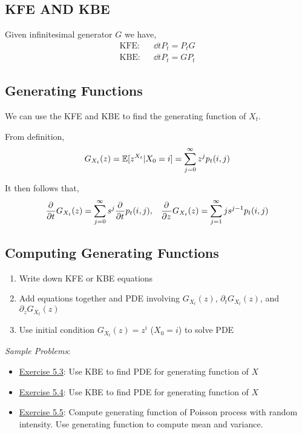 \documentclass[12pt]{article}
\begin{document}
\subsection{KFE AND KBE}
Given infinitesimal generator \( G \) we have,
\begin{align*}
    \text{KFE}: && \dd{}{t}P_t = P_t G \\
    \text{KBE}: && \dd{}{t}P_t = GP_t
\end{align*}

\subsection{Generating Functions}
We can use the KFE and KBE to find the generating function of \( X_t \).

From definition,
\begin{align*}
    G_{X_t}(z) = \mathbb{E}[z^{X_t} | X_0 = i] = \sum_{j=0}^{\infty} z^j p_t(i,j)
\end{align*}

It then follows that,
\begin{align*}
    \frac{\partial^{}}{\partial t^{}}G_{X_t}(z) = \sum_{j=0}^{\infty} s^j  \frac{\partial^{}}{\partial t^{}} p_{t}(i,j) 
    ,&&
    \frac{\partial^{}}{\partial z^{}}G_{X_t}(z) = \sum_{j=1}^{\infty} js^{j-1}p_t(i,j)
\end{align*}

\subsection{Computing Generating Functions}
\begin{enumerate}[nolistsep]
    \item Write down KFE or KBE equations
    \item Add equations together and PDE involving \( G_{X_t}(z) \), \( \partial_t G_{X_t}(z) \), and \( \partial_z G_{X_t}(z) \)
    \item Use initial condition \( G_{X_t}(z) = z^i \) (\(X_0 = i \)) to solve PDE
\end{enumerate}



\textit{Sample Problems}: 
\begin{itemize}[nolistsep]
    \item \hyperref[Exercise 5.3]{Exercise 5.3}: Use KBE to find PDE for generating function of \( X \)
    \item \hyperref[Exercise 5.4]{Exercise 5.4}: Use KBE to find PDE for generating function of \( X \)
    \item \hyperref[Exercise 5.5]{Exercise 5.5}: Compute generating function of Poisson process with random intensity. Use generating function to compute mean and variance.
\end{itemize}
\end{document}
